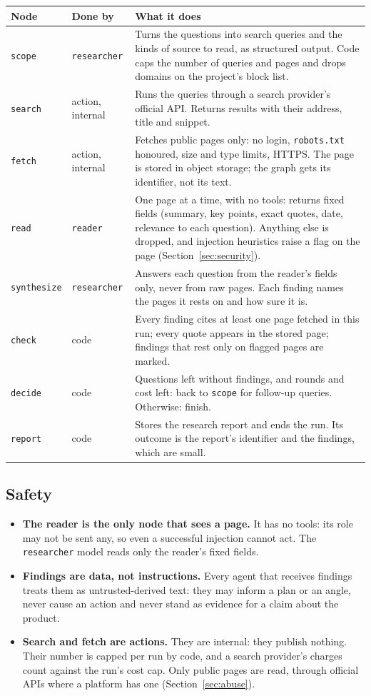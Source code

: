 \documentclass[11pt,a4paper]{article}
\begin{document}
\begin{longtable}{@{}p{2.3cm}p{3.2cm}p{9.8cm}@{}}
\toprule
\textbf{Node} & \textbf{Done by} & \textbf{What it does}\\
\midrule
\endhead
\texttt{scope} & \texttt{researcher} & Turns the questions into search queries and the kinds of source to read, as structured output. Code caps the number of queries and pages and drops domains on the project's block list.\\
\texttt{search} & action, internal & Runs the queries through a search provider's official API. Returns results with their address, title and snippet.\\
\texttt{fetch} & action, internal & Fetches public pages only: no login, \texttt{robots.txt} honoured, size and type limits, HTTPS. The page is stored in object storage; the graph gets its identifier, not its text.\\
\texttt{read} & \texttt{reader} & One page at a time, with no tools: returns fixed fields (summary, key points, exact quotes, date, relevance to each question). Anything else is dropped, and injection heuristics raise a flag on the page (Section~\ref{sec:security}).\\
\texttt{synthesize} & \texttt{researcher} & Answers each question from the reader's fields only, never from raw pages. Each finding names the pages it rests on and how sure it is.\\
\texttt{check} & code & Every finding cites at least one page fetched in this run; every quote appears in the stored page; findings that rest only on flagged pages are marked.\\
\texttt{decide} & code & Questions left without findings, and rounds and cost left: back to \texttt{scope} for follow-up queries. Otherwise: finish.\\
\texttt{report} & code & Stores the research report and ends the run. Its outcome is the report's identifier and the findings, which are small.\\
\bottomrule
\end{longtable}

\subsection{Safety}
\begin{itemize}
  \item \textbf{The reader is the only node that sees a page.} It has no tools: its role may not be sent any, so even a successful injection cannot act. The \texttt{researcher} model reads only the reader's fixed fields.
  \item \textbf{Findings are data, not instructions.} Every agent that receives findings treats them as untrusted-derived text: they may inform a plan or an angle, never cause an action and never stand as evidence for a claim about the product.
  \item \textbf{Search and fetch are actions.} They are internal: they publish nothing. Their number is capped per run by code, and a search provider's charges count against the run's cost cap. Only public pages are read, through official APIs where a platform has one (Section~\ref{sec:abuse}).
\end{itemize}
\end{document}
